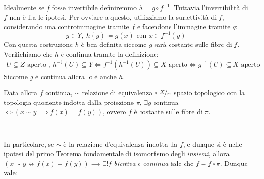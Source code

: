 \begin{demonstration}
	Idealmente se $f$ fosse invertibile definiremmo $h=g\circ f^{-1}$. Tuttavia l'invertibilità di $f$ non è fra le ipotesi. Per ovviare a questo, utilizziamo la suriettività di $f$, considerando una controimmagine tramite $f$ e facendone l'immagine tramite $g$:
	\begin{equation*}
		y\in Y, \ h(y)\coloneqq g(x)\text{ con }x\in f^{-1}(y)
	\end{equation*}
	Con questa costruzione $h$ è ben definita siccome $g$ sarà costante sulle fibre di $f$. Verifichiamo che $h$ è continua tramite la definizione:
		\begin{gather*}
			U\subseteq Z \text{ aperto }, \ h^{-1}(U)\subseteq Y \iff f^{-1}(h^{-1}(U))\subseteq X \text{ aperto} \iff g^{-1}(U)\subseteq X \text{ aperto}
		\end{gather*}
	\vspace{-2mm}
	Siccome $g$ è continua allora lo è anche $h$.
\end{demonstration}
\begin{minipage}[t]{0.83\textwidth} \label{proprietà identificazione quoziente e mappa continua indotta}
Data allora $f$ continua, $\sim$ relazione di equivalenza e $\nicefrac{X}{\sim}$ spazio topologico con la topologia quoziente indotta dalla proiezione $\pi$, $\exists g$ continua $\iff \left( x\sim y \implies f(x)=f(y) \right)$, ovvero $f$ è costante sulle fibre di $\pi$.
\end{minipage}
\begin{minipage}[t]{0.16\textwidth}\vspace{-10pt}
	\end{minipage}\\
\hspace{-1mm}
\begin{minipage}[t]{0.83\textwidth}\vspace{2mm}
In particolare, se $\sim$ è la relazione d'equivalenza indotta da $f$, e dunque si è nelle ipotesi del primo Teorema fondamentale di isomorfismo degli \textit{insiemi}, allora $\left( x\sim y \iff f(x)=f(y) \right) \implies \exists ! \overline{f}$ \textit{biettiva} e \textit{continua} tale che $f=\overline{f}\circ \pi$. Dunque vale:
	 	\end{minipage}

